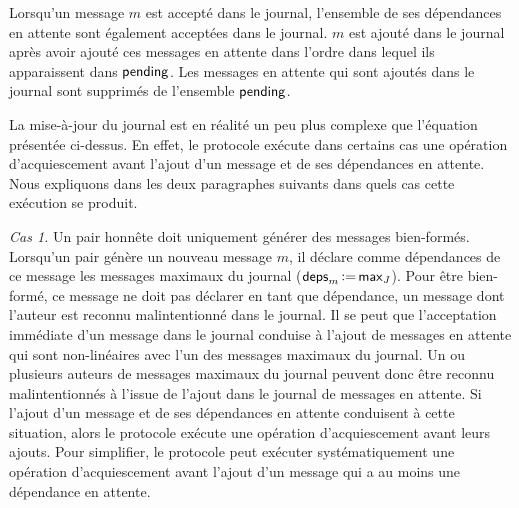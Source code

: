 Lorsqu'un message $m$ est accepté dans le journal, l'ensemble de ses dépendances en attente sont également acceptées dans le journal.
$m$ est ajouté dans le journal après avoir ajouté ces messages en attente dans l'ordre dans lequel ils apparaissent dans $\operatorname{\mathsf{pending}}$.
Les messages en attente qui sont ajoutés dans le journal sont supprimés de l'ensemble $\operatorname{\mathsf{pending}}$.



La mise-à-jour du journal est en réalité un peu plus complexe que l'équation présentée ci-dessus.
En effet, le protocole exécute dans certains cas une opération d'acquiescement avant l'ajout d'un message et de ses dépendances en attente.
Nous expliquons dans les deux paragraphes suivants dans quels cas cette exécution se produit.

\emph{Cas 1.} Un pair honnête doit uniquement générer des messages bien-formés.
Lorsqu'un pair génère un nouveau message $m$, il déclare comme dépendances de ce message les messages maximaux du journal ($\operatorname{\mathsf{deps}}_m \operatorname{\vcentcolon=} \operatorname{\mathsf{max}}_J$).
Pour être bien-formé, ce message ne doit pas déclarer en tant que dépendance, un message dont l'auteur est reconnu malintentionné dans le journal.
Il se peut que l'acceptation immédiate d'un message dans le journal conduise à l'ajout de messages en attente qui sont non-linéaires avec l'un des messages maximaux du journal.
Un ou plusieurs auteurs de messages maximaux du journal peuvent donc être reconnu malintentionnés à l'issue de l'ajout dans le journal de messages en attente.
Si l'ajout d'un message et de ses dépendances en attente conduisent à cette situation, alors le protocole exécute une opération d'acquiescement avant leurs ajouts.
Pour simplifier, le protocole peut exécuter systématiquement une opération d'acquiescement avant l'ajout d'un message qui a au moins une dépendance en attente.

